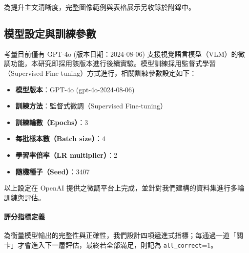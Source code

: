 \documentclass[UTF8, fontset=none]{ctexart}
\begin{document}
為提升主文清晰度，完整圖像範例與表格展示另收錄於附錄中。

\subsection{模型設定與訓練參數}

考量目前僅有 GPT-4o (版本日期：2024-08-06) 支援視覺語言模型（VLM）的微調功能，本研究即採用該版本進行後續實驗。模型訓練採用監督式學習（Supervised Fine-tuning）方式進行，相關訓練參數設定如下：

\begin{itemize}[leftmargin=2em]
  \item \textbf{模型版本}：GPT-4o (gpt-4o-2024-08-06)
  \item \textbf{訓練方法}：監督式微調（Supervised Fine-tuning）
  \item \textbf{訓練輪數（Epochs）}：3
  \item \textbf{每批樣本數（Batch size）}：4
  \item \textbf{學習率倍率（LR multiplier）}：2
  \item \textbf{隨機種子（Seed）}：3407
\end{itemize}



以上設定在 OpenAI 提供之微調平台上完成，並針對我們建構的資料集進行多輪訓練與評估。
\paragraph{評分指標定義}
為衡量模型輸出的完整性與正確性，我們設計四項遞進式指標；每通過一道「關卡」才會進入下一層評估，最終若全部滿足，則記為 \texttt{all\_correct}=1。
\end{document}
